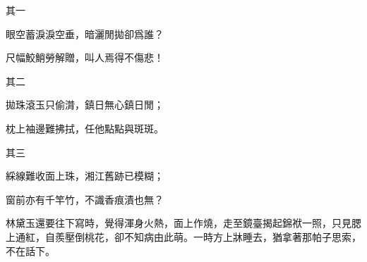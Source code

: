 \begin{poem}
    \begin{pl}其一\end{pl}

    \begin{pl}眼空蓄淚淚空垂，暗灑閒拋卻爲誰？\end{pl}

    \begin{pl}尺幅鮫鮹勞解贈，叫人焉得不傷悲！\end{pl}
    \emptypl

    \begin{pl}其二\end{pl}

    \begin{pl}拋珠滾玉只偷潸，鎮日無心鎮日閒；\end{pl}

    \begin{pl}枕上袖邊難拂拭，任他點點與斑斑。\end{pl}
    \emptypl

    \begin{pl}其三\end{pl}

    \begin{pl}綵線難收面上珠，湘江舊跡已模糊；\end{pl}

    \begin{pl}窗前亦有千竿竹，不識香痕漬也無？\end{pl}
\end{poem}


\begin{parag}
    林黛玉還要往下寫時，覺得渾身火熱，面上作燒，走至鏡臺揭起錦袱一照，只見腮上通紅，自羨壓倒桃花，卻不知病由此萌。一時方上牀睡去，猶拿著那帕子思索，不在話下。
\end{parag}


